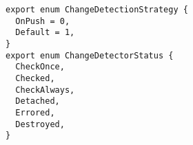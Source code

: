 \begin{verbatim}
export enum ChangeDetectionStrategy {
  OnPush = 0,
  Default = 1,
}
export enum ChangeDetectorStatus {
  CheckOnce,
  Checked,
  CheckAlways,
  Detached,
  Errored,
  Destroyed,
}
\end{verbatim}
